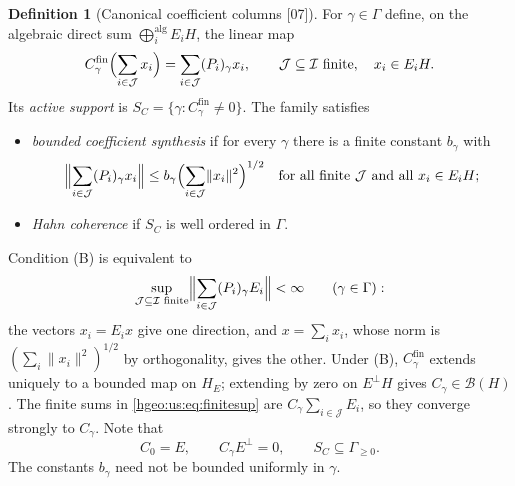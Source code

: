 \documentclass[11pt,letterpaper]{article}
\numberwithin{equation}{section}
\theoremstyle{definition}
\newtheorem{definition}[definition]{Definition}
\theoremstyle{remark}
\newcommand{\norm}[1]{\lVert #1\rVert}
\newcommand{\src}[1]{\textup{\textsf{\small[#1]}}}
\newcommand{\fin}{\mathrm{fin}}
\begin{document}
\begin{definition}[Canonical coefficient columns \src{07}]
\label{hgeo:us:def:columns}
For $\gamma\in\Gamma$ define, on the algebraic direct sum
$\bigoplus_i^{\mathrm{alg}}E_iH$, the linear map
\begin{equation}\label{hgeo:us:eq:columns}
 C_\gamma^\fin\Bigl(\sum_{i\in\mathcal J}x_i\Bigr)
 =\sum_{i\in\mathcal J}(P_i)_\gamma x_i,
 \qquad \mathcal J\subseteq\mathcal I\text{ finite},\quad x_i\in E_iH .
\end{equation}
Its \emph{active support} is $S_C=\{\gamma:C_\gamma^\fin\ne0\}$. The family
satisfies
\begin{itemize}[leftmargin=2.2em]
\item[\textup{(B)}] \emph{bounded coefficient synthesis} if for every
$\gamma$ there is a finite constant $b_\gamma$ with
\[
 \Bigl\|\sum_{i\in\mathcal J}(P_i)_\gamma x_i\Bigr\|
 \le b_\gamma\Bigl(\sum_{i\in\mathcal J}\norm{x_i}^2\Bigr)^{1/2}
 \quad\text{for all finite }\mathcal J\text{ and all }x_i\in E_iH;
\]
\item[\textup{(H)}] \emph{Hahn coherence} if $S_C$ is well ordered in
$\Gamma$.
\end{itemize}
\end{definition}

Condition (B) is equivalent to
\begin{equation}\label{hgeo:us:eq:finitesup}
 \sup_{\mathcal J\subseteq\mathcal I\text{ finite}}
 \Bigl\|\sum_{i\in\mathcal J}(P_i)_\gamma E_i\Bigr\|<\infty\qquad
 (\gamma\in\Gamma):
\end{equation}
the vectors $x_i=E_ix$ give one direction, and $x=\sum_ix_i$, whose norm is
$(\sum_i\norm{x_i}^2)^{1/2}$ by orthogonality, gives the other. Under (B),
$C_\gamma^\fin$ extends uniquely to a bounded map on $H_E$; extending by zero
on $E^\perp H$ gives $C_\gamma\in\mathcal B(H)$. The finite sums in
\eqref{hgeo:us:eq:finitesup} are $C_\gamma\sum_{i\in\mathcal J}E_i$, so they
converge strongly to $C_\gamma$. Note that
\[
 C_0=E,\qquad C_\gamma E^\perp=0,\qquad S_C\subseteq\Gamma_{\ge0}.
\]
The constants $b_\gamma$ need not be bounded uniformly in $\gamma$.
\end{document}
